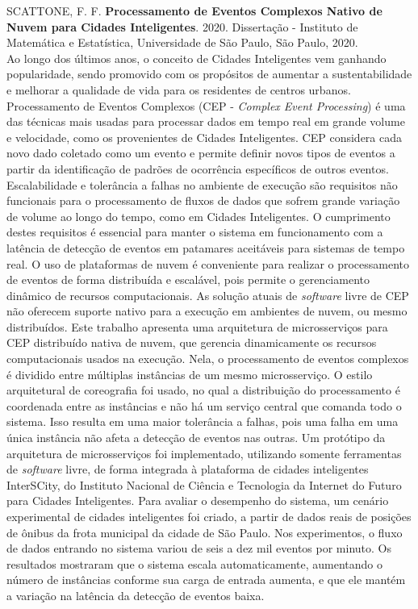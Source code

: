 \documentclass[11pt,twoside,a4paper]{book}
\begin{document}
\noindent SCATTONE, F. F. \textbf{Processamento de Eventos Complexos Nativo de Nuvem para Cidades Inteligentes}. 2020. Dissertação %
- Instituto de Matemática e Estatística, Universidade de São Paulo, São Paulo, 2020.\\
Ao longo dos últimos anos, o conceito de Cidades Inteligentes vem ganhando popularidade, sendo promovido com os propósitos de aumentar a sustentabilidade e melhorar a qualidade de vida para os residentes de centros urbanos. Processamento de Eventos Complexos (CEP - \emph{Complex Event Processing}) é uma das técnicas mais usadas para processar dados em tempo real em grande volume e velocidade, como os provenientes de Cidades Inteligentes. CEP considera cada novo dado coletado como um evento e permite definir novos tipos de eventos a partir da identificação de padrões de ocorrência específicos de outros eventos. Escalabilidade e tolerância a falhas no ambiente de execução são requisitos não funcionais para o processamento de fluxos de dados que sofrem grande variação de volume ao longo do tempo, como em Cidades Inteligentes. O cumprimento destes requisitos é essencial para manter o sistema em funcionamento com a latência de detecção de eventos em patamares aceitáveis para sistemas de tempo real. O uso de plataformas de nuvem é conveniente para realizar o processamento de eventos de forma distribuída e escalável, pois permite o gerenciamento dinâmico de recursos computacionais. 
As solução atuais de \textit{software} livre de CEP não oferecem suporte nativo para a execução em ambientes de nuvem, ou mesmo distribuídos.
Este trabalho apresenta uma arquitetura de microsserviços para CEP distribuído nativa de nuvem, que gerencia dinamicamente os recursos computacionais usados na execução. Nela, o processamento de eventos complexos é dividido entre múltiplas instâncias de um mesmo microsserviço. O estilo arquitetural de coreografia foi usado, no qual a distribuição do processamento é coordenada entre as instâncias e não há um serviço central que comanda todo o sistema. Isso resulta em uma maior tolerância a falhas, pois uma falha em uma única instância não afeta a detecção de eventos nas outras. Um protótipo da arquitetura de microsserviços foi implementado, utilizando somente ferramentas de \textit{software} livre, de forma integrada à plataforma de cidades inteligentes InterSCity, do Instituto Nacional de Ciência e Tecnologia da Internet do Futuro para Cidades Inteligentes. Para avaliar o desempenho do sistema, um cenário experimental de cidades inteligentes foi criado, a partir de dados reais de posições de ônibus da frota municipal da cidade de São Paulo. Nos experimentos, o fluxo de dados entrando no sistema variou de seis a dez mil eventos por minuto. Os resultados mostraram que o sistema escala automaticamente, aumentando o número de instâncias conforme sua carga de entrada aumenta, e que ele mantém a variação na latência da detecção de eventos baixa.\\
\end{document}
